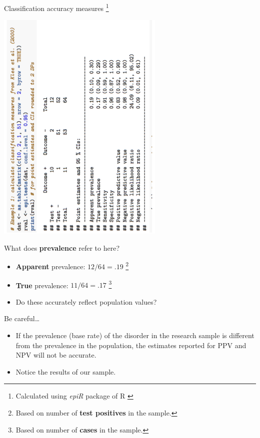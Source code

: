 \documentclass{beamer}
\begin{document}
% 
\begin{frame}{Classification accuracy measures \footnote{\tiny{Calculated using \emph{epiR} package of R \citep{RCoreTeam2019, Stevenson2017}}}} 
	\begin{center}
	\includegraphics[angle=270, width=8cm]{images/epiR_screenshot1.pdf}
	\end{center}	
\end{frame}

\begin{frame}{What does \textbf{prevalence} refer to here?}
	\begin{itemize}
	\item \textbf{Apparent} prevalence: $12 / 64 = .19$ \footnote{Based on number of \textbf{test positives} in the sample.} 
	\item \textbf{True} prevalence: $11 / 64 = .17$ \footnote{Based on number of \textbf{cases} in the sample.}
	\item Do these accurately reflect population values?
	\end{itemize}
\end{frame}

% 
\begin{frame}{Be careful\dots}
	\begin{itemize}
	\item If the prevalence (base rate) of the disorder in the \alert{research sample} is different from the prevalence in the \alert{population}, the estimates reported for PPV and NPV will \alert{not} be accurate.
	\item Notice the results of our sample.
	\end{itemize}
\end{frame}
\end{document}
